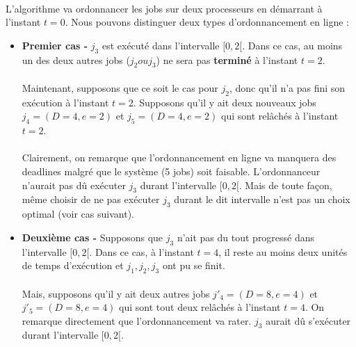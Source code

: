 \paragraph{} 
L'algorithme va ordonnancer les jobs sur deux processeurs en démarrant à l'instant $t = 0$. Nous pouvons distinguer deux types d'ordonnancement en ligne : 
  \begin{itemize}
    \item \textbf{Premier cas  -} $j_{3}$ est exécuté dans l'intervalle $[0,2[$. Dans ce 
          cas, au moins un des deux autres jobs ($j_{2} ou j_{3}$) ne sera pas 
          \textbf{terminé} à l'instant $t = 2$.
          \paragraph{}
    	  Maintenant, supposons que ce soit le cas pour $j_{2}$, donc qu'il n'a pas fini 
          son exécution à l'instant $t = 2$. Supposons qu'il y ait deux nouveaux jobs 
          $j_{4} = (D = 4, e = 2)$ et $j_{5} = (D = 4, e = 2)$ qui sont relâchés à 
          l'instant $t = 2$. 
          \paragraph{}
          Clairement, on remarque que l'ordonnancement en ligne va manquera des 
          deadlines malgré que le système (5 jobs) soit faisable. L'ordonnanceur 
          n'aurait pas dû exécuter $j_{3}$ durant l'intervalle $[0, 2[$. Mais de toute 
          façon, même choisir de ne pas exécuter $j_{3}$ durant le dit intervalle n'est 
          pas un choix optimal (voir cas suivant).
          
    \item \textbf{Deuxième cas -} Supposons que $j_{3}$ n'ait pas du tout progressé dans 
          l'intervalle $[0, 2[$. Dans ce cas, à l'instant $t = 4$, il reste au moins 
          deux unités de temps d'exécution et $j_{1}, j_{2}, j_{3}$ ont pu se finit.
          \paragraph{}
          Mais, supposons qu'il y ait deux autres jobs $j'_{4} = (D = 8, e = 4)$ et 
          $j'_{5} = (D = 8, e = 4)$ qui sont tout deux relâchés à l'instant $t = 4$. On 
          remarque directement que l'ordonnancement va rater. $j_{3}$ aurait dû 
          s'exécuter durant l'intervalle $[0, 2[$.
  \end{itemize}
  
